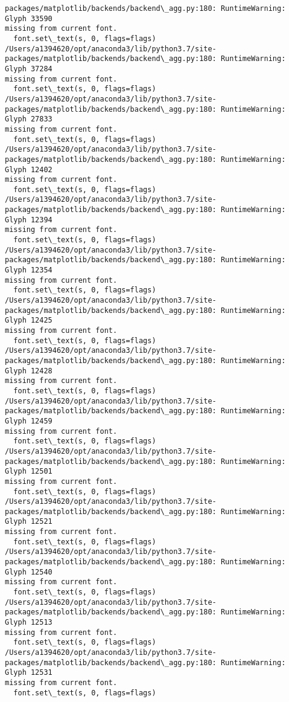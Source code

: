 \documentclass[11pt]{article}
\begin{document}
\begin{Verbatim}[commandchars=\\\{\}]
packages/matplotlib/backends/backend\_agg.py:180: RuntimeWarning: Glyph 33590
missing from current font.
  font.set\_text(s, 0, flags=flags)
/Users/a1394620/opt/anaconda3/lib/python3.7/site-
packages/matplotlib/backends/backend\_agg.py:180: RuntimeWarning: Glyph 37284
missing from current font.
  font.set\_text(s, 0, flags=flags)
/Users/a1394620/opt/anaconda3/lib/python3.7/site-
packages/matplotlib/backends/backend\_agg.py:180: RuntimeWarning: Glyph 27833
missing from current font.
  font.set\_text(s, 0, flags=flags)
/Users/a1394620/opt/anaconda3/lib/python3.7/site-
packages/matplotlib/backends/backend\_agg.py:180: RuntimeWarning: Glyph 12402
missing from current font.
  font.set\_text(s, 0, flags=flags)
/Users/a1394620/opt/anaconda3/lib/python3.7/site-
packages/matplotlib/backends/backend\_agg.py:180: RuntimeWarning: Glyph 12394
missing from current font.
  font.set\_text(s, 0, flags=flags)
/Users/a1394620/opt/anaconda3/lib/python3.7/site-
packages/matplotlib/backends/backend\_agg.py:180: RuntimeWarning: Glyph 12354
missing from current font.
  font.set\_text(s, 0, flags=flags)
/Users/a1394620/opt/anaconda3/lib/python3.7/site-
packages/matplotlib/backends/backend\_agg.py:180: RuntimeWarning: Glyph 12425
missing from current font.
  font.set\_text(s, 0, flags=flags)
/Users/a1394620/opt/anaconda3/lib/python3.7/site-
packages/matplotlib/backends/backend\_agg.py:180: RuntimeWarning: Glyph 12428
missing from current font.
  font.set\_text(s, 0, flags=flags)
/Users/a1394620/opt/anaconda3/lib/python3.7/site-
packages/matplotlib/backends/backend\_agg.py:180: RuntimeWarning: Glyph 12459
missing from current font.
  font.set\_text(s, 0, flags=flags)
/Users/a1394620/opt/anaconda3/lib/python3.7/site-
packages/matplotlib/backends/backend\_agg.py:180: RuntimeWarning: Glyph 12501
missing from current font.
  font.set\_text(s, 0, flags=flags)
/Users/a1394620/opt/anaconda3/lib/python3.7/site-
packages/matplotlib/backends/backend\_agg.py:180: RuntimeWarning: Glyph 12521
missing from current font.
  font.set\_text(s, 0, flags=flags)
/Users/a1394620/opt/anaconda3/lib/python3.7/site-
packages/matplotlib/backends/backend\_agg.py:180: RuntimeWarning: Glyph 12540
missing from current font.
  font.set\_text(s, 0, flags=flags)
/Users/a1394620/opt/anaconda3/lib/python3.7/site-
packages/matplotlib/backends/backend\_agg.py:180: RuntimeWarning: Glyph 12513
missing from current font.
  font.set\_text(s, 0, flags=flags)
/Users/a1394620/opt/anaconda3/lib/python3.7/site-
packages/matplotlib/backends/backend\_agg.py:180: RuntimeWarning: Glyph 12531
missing from current font.
  font.set\_text(s, 0, flags=flags)

\end{Verbatim}
\end{document}
